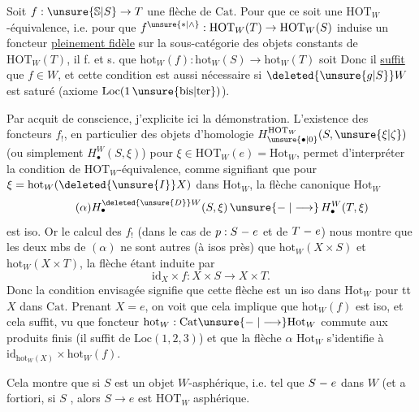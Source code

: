 Soit $f:\unsure{\mathbb{S}|S}\to T$ une flèche de $\mathrm{Cat}$. Pour que ce soit une $\mathrm{HOT}_W$-équivalence, i.e. pour que $f^{\unsure{*|\wedge}}:\mathrm{HOT}_W(T)\to\mathrm{HOT}_W(S)$ induise un foncteur \uline{pleinement fidèle} sur la sous-catégorie des objets constants de $\mathrm{HOT}_W(T)$, il f. et s. que $\mathrm{hot}_W(f):\mathrm{hot}_W(S)\longrightarrow\mathrm{hot}_W(T)$ soit  Donc il \uline{suffit} que $f\in W$, et cette condition est aussi nécessaire si $\deleted{\unsure{g|S}}W$ est  saturé (axiome $\mathrm{Loc}(1\,\unsure{\mathrm{bis}|\mathrm{ter}})$).

Par acquit de conscience, j'explicite ici la démonstration. L'existence des foncteurs
$f_!$, en particulier des objets d'homologie $H_{\unsure{\bullet|0}}^{\mathrm{HOT}_W}(S,\unsure{\xi|\zeta})$ (ou simplement $H_{\bullet}^W(S,\xi)$) pour $\xi\in\mathrm{HOT}_W(e)=\mathrm{Hot}_W$, permet d'interpréter  la condition de $\mathrm{HOT}_W$-équivalence, comme signifiant que pour  $\xi=\mathrm{hot}_W(\deleted{\unsure{I}}X)$ dans $\mathrm{Hot}_W$, la  flèche canonique  $\mathrm{Hot}_W$
\begingroup
\makeatletter
\tagsleft@true
\makeatother
\[
\tag*{$(\alpha)$}
H_{\bullet}^{\deleted{\unsure{D}}W}(S,\xi)\,\unsure{\relbar|\longrightarrow}\,H_{\bullet}^{W}(T,\xi)
\]
\endgroup
est iso. Or le calcul des $f_!$ (dans le cas de $p:S\relbar e$ et de $T\relbar e$) nous montre que les deux mbs de $(\alpha)$ ne sont autres  (à isos près) que $\mathrm{hot}_W(X\times S)$ et $\mathrm{hot}_W(X\times T)$, la flèche étant induite par
\begingroup
\makeatletter
\tagsleft@true
\makeatother
\[
\mathrm{id}_X\times f:X\times S\longrightarrow X\times T .
\tag*{$(\alpha)$}
\]
\endgroup
Donc la condition envisagée signifie que cette flèche est un iso dans $\mathrm{Hot}_W$ pour tt $X$ dans $\mathrm{Cat}$. Prenant $X=e$, on voit que cela implique que $\mathrm{hot}_W(f)$ est iso, et cela suffit, vu que 
foncteur $\mathrm{hot}_W:\mathrm{Cat}\unsure{\relbar|\longrightarrow}\mathrm{Hot}_W$ commute aux produits finis (il suffit de $\mathrm{Loc}(1,2,3)$) et que la flèche $\alpha$  $\mathrm{Hot}_W$ s'identifie à $\mathrm{id}_{\mathrm{hot}_W(X)}\times\mathrm{hot}_W(f)$.

Cela montre  que si $S$ est un objet $W$-asphérique, i.e. tel que $S\relbar e$  dans $W$ (et a fortiori, si $S$  , alors $S\longrightarrow e$ est $\mathrm{HOT}_W$ asphérique. 

